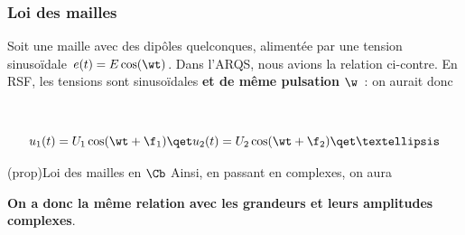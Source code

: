 \documentclass[../../main/main.tex]{subfiles}
\begin{document}
\subsubsection{Loi des mailles}
\noindent
\begin{minipage}[t]{.48\linewidth}
	Soit une maille avec des dipôles quelconques, alimentée par une tension
	sinusoïdale $e(t) = E\cos(\wt)$. Dans l'ARQS, nous avions la relation
	ci-contre. En RSF, les tensions sont sinusoïdales \textbf{et de même
		pulsation} $\w$~: on aurait donc
\end{minipage}
\hfill
\begin{minipage}[t]{.48\linewidth}
	~
	\vspace{-40pt}
	\begin{center}
	\end{center}
\end{minipage}
\[
	u_1(t) = U_1\cos(\wt+\f_1)
	\qet
	u_2(t) = U_2\cos(\wt+\f_2)
	\qet
	…
\]

\begin{tcb}(prop){Loi des mailles en $\Cb$}
	Ainsi, en passant en complexes, on aura
	\vspace{-25pt}
	\begin{center}
		\textbf{On a donc la même relation avec les grandeurs et leurs amplitudes
			complexes}.
	\end{center}
\end{tcb}
\end{document}
